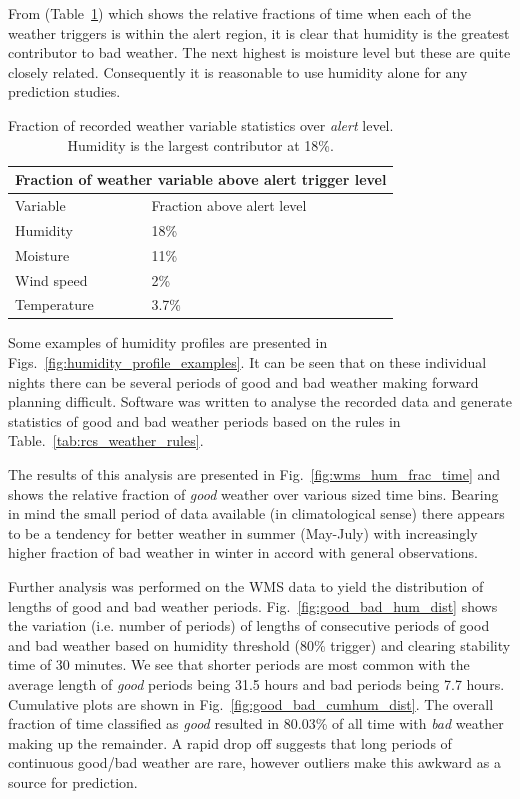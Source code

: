 From (Table~\ref{tab:comp_meteo_trigs}) which shows the relative fractions of time when each of the weather triggers is within the alert region, it is clear that humidity is the greatest contributor to bad weather. The next highest is moisture level but these are quite closely related. Consequently it is reasonable to use humidity alone for any prediction studies.
\begin{table}[htbp]
\begin{center}
\begin{tabular}{ll}
\toprule
\multicolumn{2}{c}{Fraction of weather variable above alert trigger level} \\
\midrule
Variable & Fraction above alert level\\
\midrule
Humidity    & 18\%  \\
Moisture    & 11\%  \\
Wind speed  & 2\%   \\
Temperature & 3.7\% \\
\bottomrule
\end{tabular}
\end{center}
\caption[Fraction of recorded weather variable statistics over \emph{alert} level.]{Fraction of recorded weather variable statistics over \emph{alert} level. Humidity is the largest contributor at 18\%.}
\label{tab:comp_meteo_trigs}
\end{table}

Some examples of humidity profiles are presented in Figs.~\ref{fig:humidity_profile_examples}. It can be seen that on these individual nights there can be several periods of good and bad weather making forward planning difficult. Software was written to analyse the recorded data and generate statistics of good and bad weather periods based on the rules in Table.~\ref{tab:rcs_weather_rules}.

The results of this analysis are presented in Fig.~\ref{fig:wms_hum_frac_time} and shows the relative fraction of \emph{good} weather over various sized time bins. Bearing in mind the small period of data available (in climatological sense) there appears to be a tendency for better weather in summer (May-July) with increasingly higher fraction of bad weather in winter in accord with general observations.

Further analysis was performed on the WMS data to yield the distribution of lengths of good and bad weather periods. Fig.~\ref{fig:good_bad_hum_dist} shows the variation (i.e. number of periods) of lengths  of consecutive periods of good and bad weather based on humidity threshold (80\% trigger) and clearing stability time of 30 minutes. We see that shorter periods are most common with the average length of \emph{good} periods being 31.5 hours and bad periods being 7.7 hours. Cumulative plots are shown in Fig.~\ref{fig:good_bad_cumhum_dist}. The overall fraction of time classified as \emph{good} resulted in 80.03\% of all time with \emph{bad} weather making up the remainder. A rapid drop off suggests that long periods of continuous good/bad weather are rare, however outliers make this awkward as a source for prediction.

